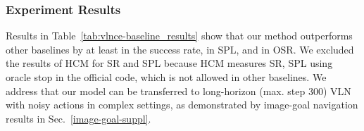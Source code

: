 \documentclass[10pt,twocolumn,letterpaper]{article}
\begin{document}
\begin{table}[tbp!]
\captionsetup{font=footnotesize}
\caption{\footnotesize Evaluation results in the VLN-CE val unseen split.
}
\label{tab:vlnce-baseline_results}\vspace{-0.3cm}
\end{table}

\subsubsection{Experiment Results}
Results in Table~\ref{tab:vlnce-baseline_results} show that our method outperforms other baselines by at least  in the success rate,  in SPL, and  in OSR. We excluded the results of HCM for SR and SPL because HCM measures SR, SPL using oracle stop in the official code, which is not allowed in other baselines. We address that our model can be transferred to long-horizon (max. step 300) VLN with noisy actions in complex settings, as demonstrated by image-goal navigation results in Sec.~\ref{image-goal-suppl}.
\end{document}
